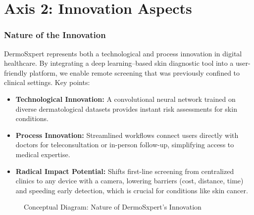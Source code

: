 
\chapter{Axis 2: Innovation Aspects}

\subsection{Nature of the Innovation}
DermoSxpert represents both a technological and process innovation in digital healthcare. By integrating a deep learning–based skin diagnostic tool into a user-friendly platform, we enable remote screening that was previously confined to clinical settings. Key points:
\begin{itemize}
  \item \textbf{Technological Innovation:} A convolutional neural network trained on diverse dermatological datasets provides instant risk assessments for skin conditions.
  \item \textbf{Process Innovation:} Streamlined workflows connect users directly with doctors for teleconsultation or in-person follow-up, simplifying access to medical expertise.
  \item \textbf{Radical Impact Potential:} Shifts first-line screening from centralized clinics to any device with a camera, lowering barriers (cost, distance, time) and speeding early detection, which is crucial for conditions like skin cancer.
\end{itemize}

\begin{figure}[H]
    \centering
    \caption{Conceptual Diagram: Nature of DermoSxpert's Innovation}
    \label{fig:innovation_nature}
\end{figure}

